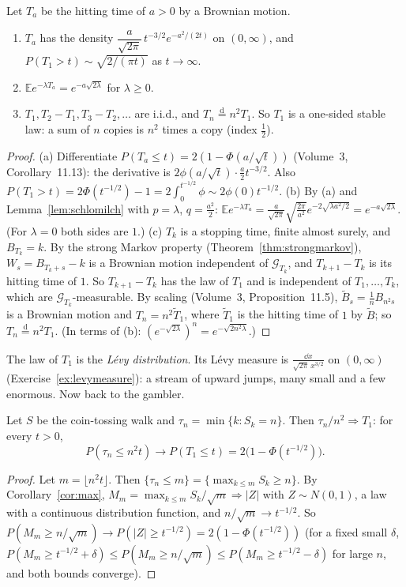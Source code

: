 \begin{theorem}\label{thm:hitting}
Let $T_a$ be the hitting time of $a>0$ by a Brownian motion.
\begin{enumerate}[label=(\alph*)]
\item $T_a$ has the density $\dfrac a{\sqrt{2\pi}}\,t^{-3/2}e^{-a^2/(2t)}$ on $(0,\infty)$, and $P(T_1>t)\sim\sqrt{2/(\pi t)}$ as $t\to\infty$.
\item $\mathbb Ee^{-\lambda T_a}=e^{-a\sqrt{2\lambda}}$ for $\lambda\ge0$.
\item $T_1,T_2-T_1,T_3-T_2,\dots$ are i.i.d., and $T_n\overset{\mathrm d}=n^2T_1$. So $T_1$ is a one-sided stable law: a sum of $n$ copies is $n^2$ times a copy (index $\frac12$).
\end{enumerate}
\end{theorem}
\begin{proof}
(a) Differentiate $P(T_a\le t)=2(1-\Phi(a/\sqrt t))$ (Volume~3, Corollary~11.13): the derivative is $2\phi(a/\sqrt t)\cdot\frac a2t^{-3/2}$. Also
$P(T_1>t)=2\Phi(t^{-1/2})-1=2\int_0^{t^{-1/2}}\phi\sim2\phi(0)t^{-1/2}$.
(b) By (a) and Lemma~\ref{lem:schlomilch} with $p=\lambda$, $q=\frac{a^2}2$: $\mathbb Ee^{-\lambda T_a}=\frac a{\sqrt{2\pi}}\sqrt{\frac{2\pi}{a^2}}e^{-2\sqrt{\lambda a^2/2}}=e^{-a\sqrt{2\lambda}}$.
(For $\lambda=0$ both sides are $1$.)
(c) $T_k$ is a stopping time, finite almost surely, and $B_{T_k}=k$. By the strong Markov property (Theorem~\ref{thm:strongmarkov}), $W_s=B_{T_k+s}-k$ is a Brownian
motion independent of $\mathcal G_{T_k}$, and $T_{k+1}-T_k$ is its hitting time of $1$. So $T_{k+1}-T_k$ has the law of $T_1$ and is independent of
$T_1,\dots,T_k$, which are $\mathcal G_{T_k}$-measurable. By scaling (Volume~3, Proposition~11.5), $\tilde B_s=\frac1nB_{n^2s}$ is a Brownian motion and
$T_n=n^2\tilde T_1$, where $\tilde T_1$ is the hitting time of $1$ by $\tilde B$; so $T_n\overset{\mathrm d}=n^2T_1$. (In terms of (b): $(e^{-\sqrt{2\lambda}})^n=e^{-\sqrt{2n^2\lambda}}$.)
\end{proof}

The law of $T_1$ is the \emph{L\'evy distribution}. Its L\'evy measure is $\frac{\dd x}{\sqrt{2\pi}\,x^{3/2}}$ on $(0,\infty)$ (Exercise~\ref{ex:levymeasure}): a stream of
upward jumps, many small and a few enormous. Now back to the gambler.

\begin{theorem}\label{thm:gambler}
Let $S$ be the coin-tossing walk and $\tau_n=\min\{k:S_k=n\}$. Then $\tau_n/n^2\Rightarrow T_1$: for every $t>0$,
\[
P(\tau_n\le n^2t)\to P(T_1\le t)=2\bigl(1-\Phi(t^{-1/2})\bigr).
\]
\end{theorem}
\begin{proof}
Let $m=\lfloor n^2t\rfloor$. Then $\{\tau_n\le m\}=\{\max_{k\le m}S_k\ge n\}$. By Corollary~\ref{cor:max}, $M_m=\max_{k\le m}S_k/\sqrt m\Rightarrow|Z|$ with $Z\sim N(0,1)$,
a law with a continuous distribution function, and $n/\sqrt m\to t^{-1/2}$. So $P(M_m\ge n/\sqrt m)\to P(|Z|\ge t^{-1/2})=2(1-\Phi(t^{-1/2}))$ (for a fixed small
$\delta$, $P(M_m\ge t^{-1/2}+\delta)\le P(M_m\ge n/\sqrt m)\le P(M_m\ge t^{-1/2}-\delta)$ for large $n$, and both bounds converge).
\end{proof}

